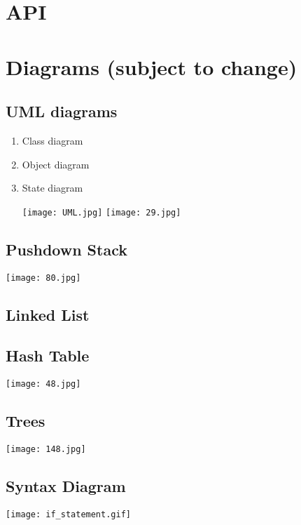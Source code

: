 \documentclass[10pt,a4paper,english]{article}
\begin{document}
\newpage
\thispagestyle{fancy}
\begin{flushleft}
\section*{API}
\section*{Diagrams \small{(subject to change)}}
\subsection*{UML diagrams}
\begin{enumerate}
\item Class diagram
\item Object diagram
\item State diagram

\texttt{[image: UML.jpg]}
\texttt{[image: 29.jpg]}
\end{enumerate}
\subsection*{Pushdown Stack}
\texttt{[image: 80.jpg]}
\subsection*{Linked List}
\subsection*{Hash Table}
\texttt{[image: 48.jpg]}
\subsection*{Trees}
\texttt{[image: 148.jpg]}
\subsection*{Syntax Diagram}
\texttt{[image: if\_statement.gif]}

\end{flushleft}
\end{document}
